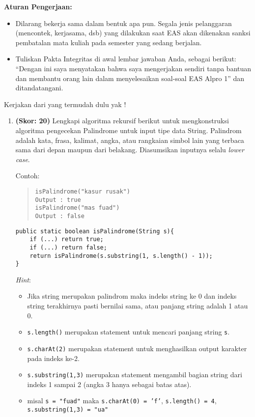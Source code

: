 \documentclass[10pt,openany,a4paper]{article}
\begin{document}
\indent
\textbf{Aturan Pengerjaan:}
\begin{itemize}
    \item Dilarang bekerja sama dalam bentuk apa pun. Segala jenis pelanggaran (mencontek, kerjasama, dsb) yang dilakukan saat EAS akan dikenakan sanksi pembatalan mata kuliah pada semester yang sedang berjalan.
    \item Tuliskan Pakta Integritas di awal lembar jawaban Anda, sebagai berikut: ``Dengan ini saya menyatakan bahwa saya mengerjakan sendiri tanpa bantuan dan membantu orang lain dalam menyelesaikan soal-soal EAS Alpro 1'' dan ditandatangani.
\end{itemize}

\noindent
Kerjakan dari yang termudah dulu yak !
\begin{enumerate}
    \item \textbf{(Skor: 20)} Lengkapi algoritma rekursif berikut untuk mengkonstruksi algoritma pengecekan Palindrome untuk input tipe data String.  Palindrom adalah kata, frasa, kalimat, angka, atau rangkaian simbol lain yang terbaca sama dari depan maupun dari belakang. Diasumsikan inputnya selalu \textit{lower case}.
    
    Contoh:
    \begin{quote}
        \noindent
        \texttt{{\color{blue}isPalindrome}({\color{red}"kasur rusak"})\\
        Output : true\\
        {\color{blue}isPalindrome}({\color{red}"mas fuad"})\\
        Output : false}
    \end{quote}
    \begin{verbatim}
public static boolean isPalindrome(String s){
    if (...) return true;
    if (...) return false;
    return isPalindrome(s.substring(1, s.length() - 1));
}
    \end{verbatim}
    \textit{Hint}:
\begin{itemize}
    \item Jika string merupakan palindrom maka indeks string ke 0 dan indeks string terakhirnya pasti bernilai sama, atau panjang string adalah 1 atau 0.
    \item \texttt{s.length()} merupakan statement untuk mencari panjang string \texttt{s}.
    \item \texttt{s.charAt(2)} merupakan statement untuk menghasilkan output karakter pada indeks ke-2.
    \item \texttt{s.substring(1,3)} merupakan statement mengambil bagian string dari indeks 1 sampai 2 (angka 3 hanya sebagai batas atas).
    \item misal \texttt{s = "fuad"} maka \texttt{s.charAt(0) = 'f'},  \texttt{s.length() = 4}, \texttt{s.substring(1,3) = "ua"}
\end{itemize}
    

\end{enumerate}
\end{document}
